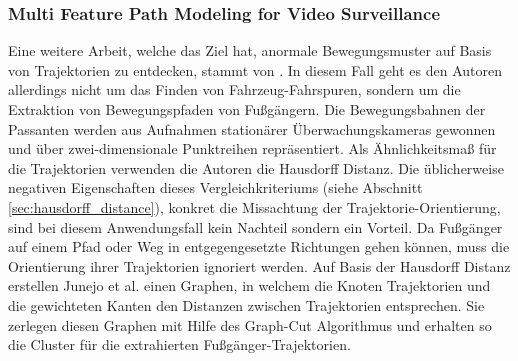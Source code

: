 \subsubsection*{Multi Feature Path Modeling for Video Surveillance}
Eine weitere Arbeit, welche das Ziel hat, anormale Bewegungsmuster auf Basis von Trajektorien zu entdecken,
stammt von \cite[]{Junejo2004}. In diesem Fall geht es den Autoren allerdings nicht um das Finden von Fahrzeug-Fahrspuren,
sondern um die Extraktion von Bewegungspfaden von Fußgängern.
Die Bewegungsbahnen der Passanten werden aus Aufnahmen stationärer Überwachungskameras gewonnen und
über zwei-dimensionale Punktreihen repräsentiert.
Als Ähnlichkeitsmaß für die Trajektorien verwenden die Autoren die Hausdorff Distanz. Die üblicherweise
negativen Eigenschaften dieses
Vergleichkriteriums (siehe Abschnitt \ref{sec:hausdorff_distance}), konkret die Missachtung der
Trajektorie-Orientierung, sind bei diesem Anwendungsfall kein Nachteil sondern ein Vorteil.
Da Fußgänger auf einem Pfad oder Weg in entgegengesetzte Richtungen gehen können, muss die Orientierung
ihrer Trajektorien ignoriert werden.
Auf Basis der Hausdorff Distanz erstellen Junejo et al. einen Graphen, in welchem die Knoten Trajektorien
und die gewichteten Kanten den Distanzen zwischen Trajektorien entsprechen.
Sie zerlegen diesen Graphen mit Hilfe des Graph-Cut Algorithmus und erhalten so die Cluster für die
extrahierten Fußgänger-Trajektorien.  








